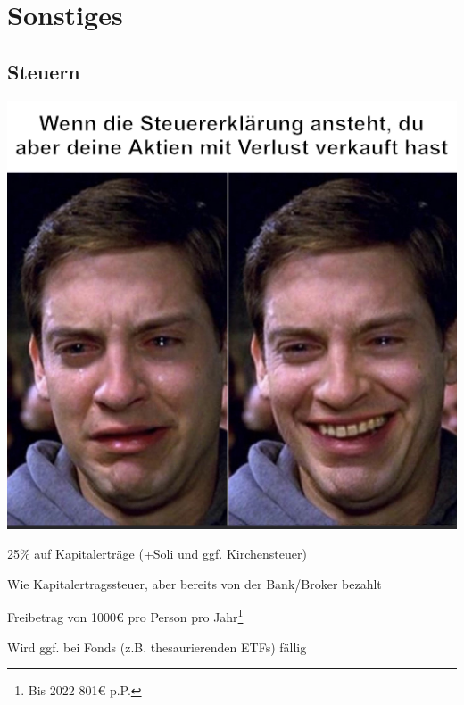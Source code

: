 \documentclass{beamer}
\begin{document}
	\section{Sonstiges}
	
		\begin{frame}
		\end{frame}
		
		\subsection{Steuern}
	
			\begin{frame}
				\begin{center}
					\vspace{-0.5cm}
					\includegraphics[height=0.85\textheight]{images/taxes-peter-parker}
				\end{center}
			\end{frame}
		
			\begin{frame}
				\begin{description}[labelwidth=0cm,align=right]
					\item[Kapitalertragssteuer] 25\% auf Kapitalerträge (+Soli und ggf. Kirchensteuer)\pause
					\item[Abgeltungssteuer] Wie Kapitalertragssteuer, aber bereits von der Bank/Broker bezahlt\pause
					\item[Sparerpauschbetrag] Freibetrag von 1000€ pro Person pro Jahr\footnote{Bis 2022 801€ p.P.}\pause
					\item[Vorabpauschale] Wird ggf. bei Fonds (z.B. thesaurierenden ETFs) fällig
				\end{description}
			\end{frame}
		
\end{document}
